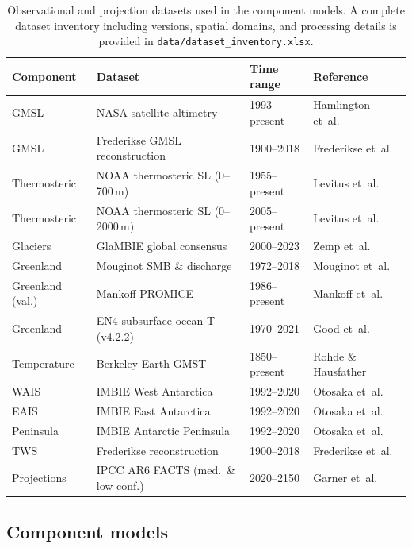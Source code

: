 \documentclass[12pt]{article}
\begin{document}
\begin{table}[ht]
\centering
\caption{Observational and projection datasets used in the component models. A complete dataset inventory including versions, spatial domains, and processing details is provided in \texttt{data/dataset\_inventory.xlsx}.}
\label{tab:obs_datasets}
\small
\begin{tabular}{llll}
\toprule
Component & Dataset & Time range & Reference \\
\midrule
GMSL & NASA satellite altimetry & 1993--present & Hamlington et~al.~\cite{Hamlington2020} \\
GMSL & Frederikse GMSL reconstruction & 1900--2018 & Frederikse et~al.~\cite{Frederikse2020} \\
Thermosteric & NOAA thermosteric SL (0--700\,m) & 1955--present & Levitus et~al.~\cite{Levitus2012} \\
Thermosteric & NOAA thermosteric SL (0--2000\,m) & 2005--present & Levitus et~al.~\cite{Levitus2012} \\
Glaciers & GlaMBIE global consensus & 2000--2023 & Zemp et~al.~\cite{GlaMBIE2025} \\
Greenland & Mouginot SMB \& discharge & 1972--2018 & Mouginot et~al.~\cite{Mouginot2019} \\
Greenland (val.) & Mankoff PROMICE & 1986--present & Mankoff et~al.~\cite{Mankoff2021} \\
Greenland & EN4 subsurface ocean T (v4.2.2) & 1970--2021 & Good et~al.~\cite{Good2013} \\
Temperature & Berkeley Earth GMST & 1850--present & Rohde \& Hausfather~\cite{Rohde2020} \\
WAIS & IMBIE West Antarctica & 1992--2020 & Otosaka et~al.~\cite{Otosaka2023} \\
EAIS & IMBIE East Antarctica & 1992--2020 & Otosaka et~al.~\cite{Otosaka2023} \\
Peninsula & IMBIE Antarctic Peninsula & 1992--2020 & Otosaka et~al.~\cite{Otosaka2023} \\
TWS & Frederikse reconstruction & 1900--2018 & Frederikse et~al.~\cite{Frederikse2020} \\
Projections & IPCC AR6 FACTS (med.\ \& low conf.) & 2020--2150 & Garner et~al.~\cite{Garner2023} \\
\bottomrule
\end{tabular}
\end{table}

\subsection{Component models}
\end{document}
